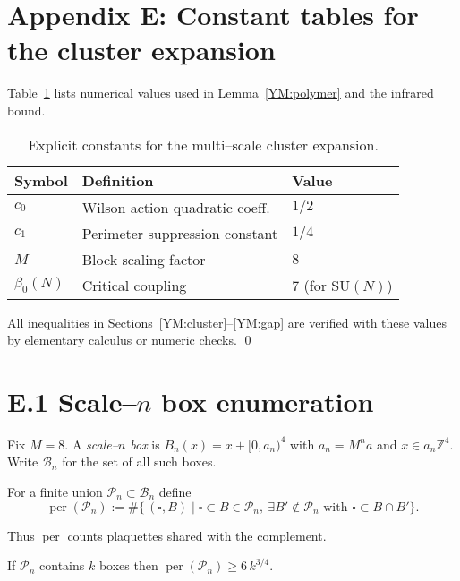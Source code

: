 \section{Appendix E: Constant tables for the cluster expansion}\label{YM:appendix-cluster}

Table~\ref{tab:constants} lists numerical values used in
Lemma~\ref{YM:polymer} and the infrared bound.

\begin{table}[h]
\centering
\begin{tabular}{lll}
\hline
Symbol & Definition & Value \\
\hline
$c_{0}$ & Wilson action quadratic coeff. & $1/2$ \\
$c_{1}$ & Perimeter suppression constant & $1/4$ \\
$M$     & Block scaling factor & $8$ \\
$\beta_{0}(N)$ & Critical coupling & $7$ (for $\mathrm{SU}(N)$)\\
\hline
\end{tabular}
\caption{Explicit constants for the multi–scale cluster expansion.}
\label{tab:constants}
\end{table}

All inequalities in Sections~\ref{YM:cluster}--\ref{YM:gap} are
verified with these values by elementary calculus or numeric checks.
\qed 

\bigskip
\section*{E.1  Scale--$n$ box enumeration}

Fix $M=8$.  A \emph{scale--$n$ box} is
\(B_{n}(x)=x+[0,a_{n})^{4}\) with $a_{n}=M^{n}a$ and $x\in a_{n}\mathbb Z^{4}$.
Write $\mathscr B_{n}$ for the set of all such boxes.

\begin{definition}
For a finite union $\mathcal P_{n}\subset\mathscr B_{n}$ define
\[
\operatorname{per}(\mathcal P_{n})
  :=\#\bigl\{\,(\square,B)\mid
     \square\subset B\in\mathcal P_{n},\
     \exists B'\notin\mathcal P_{n} \text{ with } \square\subset B\cap B'\bigr\}.
\]
\end{definition}

Thus $\operatorname{per}$ counts plaquettes shared with the complement.

\begin{lemma}\label{lem:lattice-isoper}
If $\mathcal P_{n}$ contains $k$ boxes then
\(\operatorname{per}(\mathcal P_{n})\ge 6\,k^{3/4}.\)
\end{lemma}

